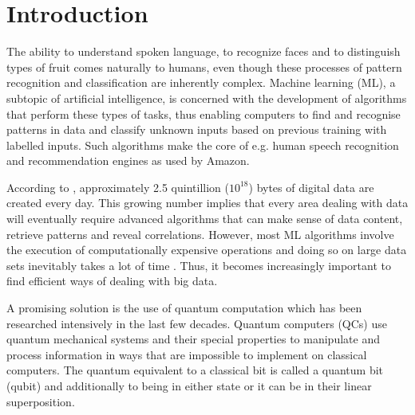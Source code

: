 \chapter{Introduction}\label{sec:introduction}

The ability to understand spoken language, to recognize faces and to distinguish types of fruit comes naturally to humans, even though these processes of pattern recognition and classification are inherently complex. Machine learning (ML), a subtopic of artificial intelligence, is concerned with the development of algorithms that perform these types of tasks, thus enabling computers to find and recognise patterns in data and classify unknown inputs based on previous training with labelled inputs. Such algorithms make the core of e.g. human speech recognition and recommendation engines as used by Amazon.

According to , approximately 2.5 quintillion (${10}^{18}$) bytes of digital data are created every day. This growing number implies that every area dealing with data will eventually require advanced algorithms that can make sense of data content, retrieve patterns and reveal correlations. However, most ML algorithms involve the execution of computationally expensive operations and doing so on large data sets inevitably takes a lot of time \cite{bekkerman2011scaling}. Thus, it becomes increasingly important to find efficient ways of dealing with big data.

A promising solution is the use of quantum computation which has been researched intensively in the last few decades. Quantum computers (QCs) use quantum mechanical systems and their special properties to manipulate and process information in ways that are impossible to implement on classical computers. The quantum equivalent to a classical bit is called a quantum bit (qubit) and additionally to being in either state \0 or \1 it can be in their linear superposition.


